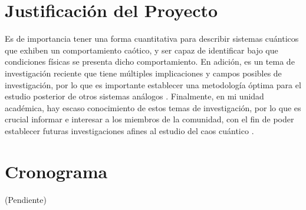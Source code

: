 \documentclass[spanish,titlepage,table]{practicas}
\begin{document}
\section{Justificación del Proyecto}
Es de importancia tener una forma cuantitativa para describir sistemas cuánticos que exhiben 
un comportamiento caótico, y ser capaz de identificar bajo que condiciones físicas se presenta 
dicho comportamiento. En adición, es un tema de investigación reciente que tiene múltiples implicaciones 
y campos posibles de investigación, por lo que es importante establecer una metodología óptima para el estudio posterior de otros sistemas análogos .
Finalmente, en mi unidad académica, hay escaso conocimiento de estos temas de investigación, por lo que 
es crucial informar e interesar a los miembros de la comunidad, con el fin de poder establecer 
futuras investigaciones afines al estudio del caos cuántico .
\section{Cronograma}
(Pendiente)
\end{document}
